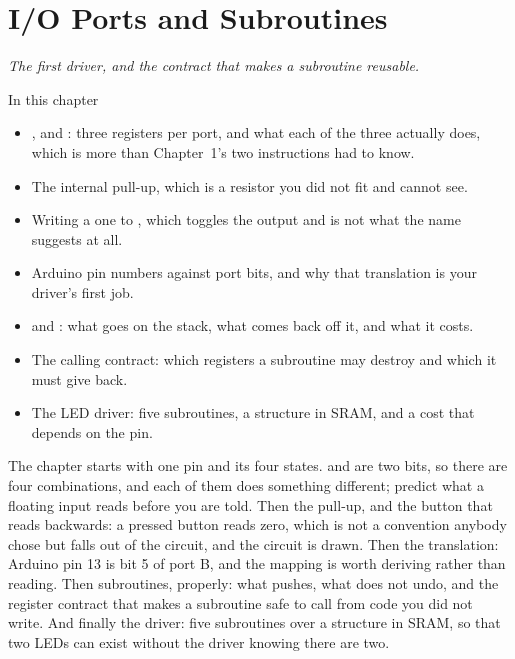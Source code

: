 
\chapter{I/O Ports and Subroutines}
\label{c2:ch:ports}

{\large\itshape The first driver, and the contract that makes a subroutine reusable.\par}

\begin{chapterbox}{In this chapter}
\begin{itemize}
  \item {},  and : three registers per port, and what each of the
    three actually does, which is more than Chapter~1's two  instructions had to know.
  \item The internal pull-up, which is a resistor you did not fit and cannot see.
  \item Writing a one to , which toggles the output and is not what the name suggests at
    all.
  \item Arduino pin numbers against port bits, and why that translation is your driver's first
    job.
  \item {} and : what goes on the stack, what comes back off it, and what it
    costs.
  \item The calling contract: which registers a subroutine may destroy and which it must give
    back.
  \item The LED driver: five subroutines, a structure in SRAM, and a cost that depends on the pin.
\end{itemize}
\end{chapterbox}

The chapter starts with one pin and its four states.  and  are two bits, so
there are four combinations, and each of them does something different; predict what a floating
input reads before you are told. Then the pull-up, and the button that reads backwards: a pressed
button reads zero, which is not a convention anybody chose but falls out of the circuit, and the
circuit is drawn. Then the translation: Arduino pin 13 is bit 5 of port B, and the mapping is worth
deriving rather than reading. Then subroutines, properly: what  pushes, what
 does not undo, and the register contract that makes a subroutine safe to call from code
you did not write. And finally the driver: five subroutines over a structure in SRAM, so that two
LEDs can exist without the driver knowing there are two.

